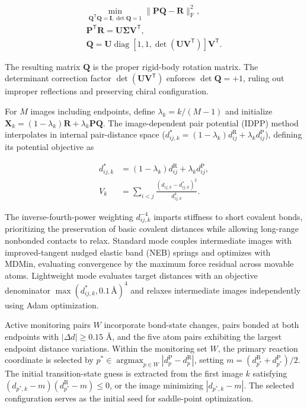 \begin{equation}\label{eq:methods-07}
\begin{gathered}
\min_{\mathbf{Q}^{\mathsf{T}}\mathbf{Q}=\mathbf{I},\det\mathbf{Q}=1}\|\mathbf{P}\mathbf{Q}-\mathbf{R}\|_{\mathrm{F}}^2,\\
\mathbf{P}^{\mathsf{T}}\mathbf{R}=\mathbf{U}\boldsymbol{\Sigma}\mathbf{V}^{\mathsf{T}},\\
\mathbf{Q}=\mathbf{U}\operatorname{diag}[1,1,\det(\mathbf{U}\mathbf{V}^{\mathsf{T}})]\mathbf{V}^{\mathsf{T}}.
\end{gathered}
\end{equation}

The resulting matrix $\mathbf{Q}$ is the proper rigid-body rotation matrix. The determinant correction factor $\det(\mathbf{U}\mathbf{V}^{\mathsf{T}})$ enforces $\det\mathbf{Q}=+1$, ruling out improper reflections and preserving chiral configuration.

For $M$ images including endpoints, define $\lambda_k=k/(M-1)$ and initialize $\mathbf{X}_k=(1-\lambda_k)\mathbf{R}+\lambda_k\mathbf{P}\mathbf{Q}$. The image-dependent pair potential (IDPP) method \citep{ref08} interpolates in internal pair-distance space ($d_{ij,k}^*=(1-\lambda_k)d_{ij}^{\mathrm{R}}+\lambda_k d_{ij}^{\mathrm{P}}$), defining its potential objective as

\begin{equation}\label{eq:methods-08}
\begin{aligned}
d_{ij,k}^*&=(1-\lambda_k)d_{ij}^{\mathrm{R}}+\lambda_k d_{ij}^{\mathrm{P}},\\
V_k&=\sum_{i<j}\frac{(d_{ij,k}-d_{ij,k}^*)^2}{d_{ij,k}^4}.
\end{aligned}
\end{equation}

The inverse-fourth-power weighting $d_{ij,k}^{-4}$ imparts stiffness to short covalent bonds, prioritizing the preservation of basic covalent distances while allowing long-range nonbonded contacts to relax. Standard mode couples intermediate images with improved-tangent nudged elastic band (NEB) springs and optimizes with MDMin, evaluating convergence by the maximum force residual across movable atoms. Lightweight mode evaluates target distances with an objective denominator $\max(d_{ij,k}^*,0.1\,\text{Å})^4$ and relaxes intermediate images independently using Adam optimization.

Active monitoring pairs $W$ incorporate bond-state changes, pairs bonded at both endpoints with $|\Delta d|\ge 0.15$ Å, and the five atom pairs exhibiting the largest endpoint distance variations. Within the monitoring set $W$, the primary reaction coordinate is selected by $p^*\in\operatorname{argmax}_{p\in W}|d_p^{\mathrm{P}}-d_p^{\mathrm{R}}|$, setting $m=(d_{p^*}^{\mathrm{R}}+d_{p^*}^{\mathrm{P}})/2$. The initial transition-state guess is extracted from the first image $k$ satisfying $(d_{p^*,k}-m)(d_{p^*}^{\mathrm{R}}-m)\le 0$, or the image minimizing $|d_{p^*,k}-m|$. The selected configuration serves as the initial seed for saddle-point optimization.

